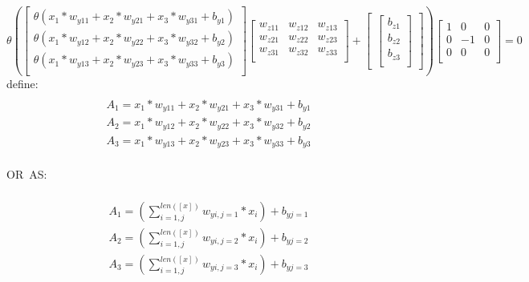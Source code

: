 \documentclass{article}
\begin{document}
\[
\theta(   
\begin{bmatrix}   
    \theta(x_1*w_{y11} + x_2*w_{y21} + x_3*w_{y31} + b_{y1})\\
    \theta(x_1*w_{y12} + x_2*w_{y22} + x_3*w_{y32} + b_{y2})\\
    \theta(x_1*w_{y13} + x_2*w_{y23} + x_3*w_{y33} + b_{y3})\\
    \end{bmatrix}
\begin{bmatrix}
    w_{z11} & w_{z12} & w_{z13}\\
    w_{z21} & w_{z22} & w_{z23}\\
    w_{z31} & w_{z32} & w_{z33}\\
\end{bmatrix}
    +
\begin{bmatrix}
    \begin{bmatrix}
        b_{z1}\\
        b_{z2}\\
        b_{z3}\\
    \end{bmatrix}
\end{bmatrix}
)
%
\begin{bmatrix}   
    1 & 0 & 0 \\
    0 & -1 & 0 \\
    0 & 0 & 0 \\
    \end{bmatrix} 
%
    = 0
\]
\hbox{define:}
\begin{multline}
    \\
    A_1 = x_1*w_{y11} + x_2*w_{y21} + x_3*w_{y31} + b_{y1}\\
    A_2 = x_1*w_{y12} + x_2*w_{y22} + x_3*w_{y32} + b_{y2}\\
    A_3 = x_1*w_{y13} + x_2*w_{y23} + x_3*w_{y33} + b_{y3}\\
\end{multline}

\hbox{OR AS:}

\begin{multline}
    \\
    A_1 = (\sum_{i=1, j}^{len([x])} w_{yi,j=1}*x_i) + b_{yj=1}\\
    A_2 = (\sum_{i=1, j}^{len([x])} w_{yi,j=2}*x_i) + b_{yj=2}\\
    A_3 = (\sum_{i=1, j}^{len([x])} w_{yi,j=3}*x_i) + b_{yj=3}\\
\end{multline}
\end{document}
